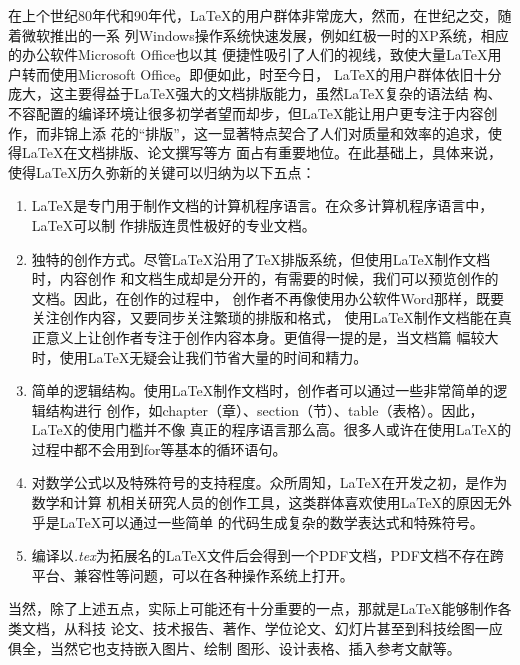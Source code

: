 在上个世纪80年代和90年代，LaTeX的用户群体非常庞大，然而，在世纪之交，随着微软推出的一系
列Windows操作系统快速发展，例如红极一时的XP系统，相应的办公软件Microsoft Office也以其
便捷性吸引了人们的视线，致使大量LaTeX用户转而使用Microsoft Office。即便如此，时至今日，
LaTeX的用户群体依旧十分庞大，这主要得益于LaTeX强大的文档排版能力，虽然LaTeX复杂的语法结
构、不容配置的编译环境让很多初学者望而却步，但LaTeX能让用户更专注于内容创作，而非锦上添
花的“排版”，这一显著特点契合了人们对质量和效率的追求，使得LaTeX在文档排版、论文撰写等方
面占有重要地位。在此基础上，具体来说，使得LaTeX历久弥新的关键可以归纳为以下五点：
\begin{enumerate}
      \item LaTeX是专门用于制作文档的计算机程序语言。在众多计算机程序语言中，LaTeX可以制
            作排版连贯性极好的专业文档。
      \item 独特的创作方式。尽管LaTeX沿用了TeX排版系统，但使用LaTeX制作文档时，内容创作
            和文档生成却是分开的，有需要的时候，我们可以预览创作的文档。因此，在创作的过程中，
            创作者不再像使用办公软件Word那样，既要关注创作内容，又要同步关注繁琐的排版和格式，
            使用LaTeX制作文档能在真正意义上让创作者专注于创作内容本身。更值得一提的是，当文档篇
            幅较大时，使用LaTeX无疑会让我们节省大量的时间和精力。
      \item 简单的逻辑结构。使用LaTeX制作文档时，创作者可以通过一些非常简单的逻辑结构进行
            创作，如chapter（章）、section（节）、table（表格）。因此，LaTeX的使用门槛并不像
            真正的程序语言那么高。很多人或许在使用LaTeX的过程中都不会用到for等基本的循环语句。
      \item 对数学公式以及特殊符号的支持程度。众所周知，LaTeX在开发之初，是作为数学和计算
            机相关研究人员的创作工具，这类群体喜欢使用LaTeX的原因无外乎是LaTeX可以通过一些简单
            的代码生成复杂的数学表达式和特殊符号。
      \item 编译以\emph{.tex}为拓展名的LaTeX文件后会得到一个PDF文档，PDF文档不存在跨
            平台、兼容性等问题，可以在各种操作系统上打开。
\end{enumerate}

当然，除了上述五点，实际上可能还有十分重要的一点，那就是LaTeX能够制作各类文档，从科技
论文、技术报告、著作、学位论文、幻灯片甚至到科技绘图一应俱全，当然它也支持嵌入图片、绘制
图形、设计表格、插入参考文献等。

